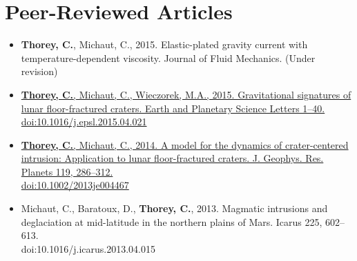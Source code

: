 \documentclass[]{friggeri-cv}
\begin{document}
\section{Peer-Reviewed Articles}
\begin{itemize}
\item \textbf{Thorey, C.}, Michaut,  C., 2015.  Elastic-plated gravity
  current  with  temperature-dependent  viscosity.  Journal  of  Fluid
  Mechanics. (Under revision)
\item  \href{http://www.ipgp.fr/~michaut/PAPERS/Thorey_etal2015.pdf}{\textbf{Thorey,  C.},  Michaut,   C.,  Wieczorek,  M.A.,  2015.
  Gravitational  signatures of  lunar floor-fractured  craters.  Earth
  and Planetary Science Letters
  1–40. \\
  doi:10.1016/j.epsl.2015.04.021}

\item \href{http://www.ipgp.fr/~michaut/PAPERS/Thorey_Michaut2014.pdf}{\textbf{Thorey, C.}, Michaut, C., 2014. A model for the dynamics
  of crater-centered  intrusion: Application to  lunar floor-fractured
  craters.       J.       Geophys.        Res.       Planets      119,
  286–312. \\
  doi:10.1002/2013je004467}
\item Michaut,  C., Baratoux, D., \textbf{Thorey,  C.}, 2013. Magmatic
  intrusions and  deglaciation at mid-latitude in  the northern plains
  of Mars. Icarus 225, 602–613. \\
  doi:10.1016/j.icarus.2013.04.015
\end{itemize}
\end{document}
